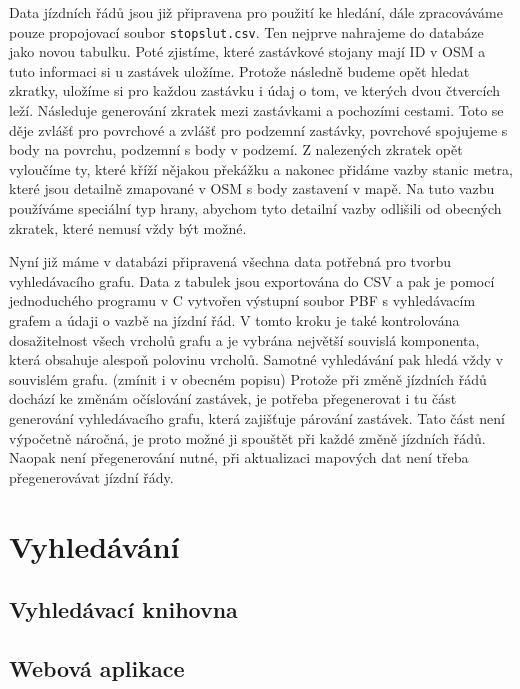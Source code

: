 Data jízdních řádů jsou již připravena pro použití ke hledání, dále zpracováváme
pouze propojovací soubor {\tt stopslut.csv}. Ten nejprve nahrajeme do databáze
jako novou tabulku. Poté zjistíme, které zastávkové stojany mají ID v OSM a tuto
informaci si u zastávek uložíme. Protože následně budeme opět hledat zkratky,
uložíme si pro každou zastávku i údaj o tom, ve kterých dvou čtvercích leží.  
Následuje generování zkratek mezi zastávkami a pochozími cestami. Toto se děje
zvlášť pro povrchové a zvlášť pro podzemní zastávky, povrchové spojujeme s body
na povrchu, podzemní s body v podzemí. Z nalezených zkratek opět vyloučíme ty,
které kříží nějakou překážku a nakonec přidáme vazby stanic metra, které jsou
detailně zmapované v OSM s body zastavení v mapě. Na tuto vazbu používáme
speciální typ hrany, abychom tyto detailní vazby odlišili od obecných zkratek,
které nemusí vždy být možné. 

Nyní již máme v databázi připravená všechna data potřebná pro tvorbu
vyhledávacího grafu. Data z tabulek jsou exportována do CSV a pak je pomocí
jednoduchého programu v C vytvořen výstupní soubor PBF s vyhledávacím grafem a
údaji o vazbě na jízdní řád. V tomto kroku je také kontrolována dosažitelnost
všech vrcholů grafu a je vybrána největší souvislá komponenta, která obsahuje
alespoň polovinu vrcholů. Samotné vyhledávání pak hledá vždy v souvislém grafu.
(\TODO zmínit i v obecném popisu) Protože při změně jízdních řádů dochází ke změnám
očíslování zastávek, je potřeba přegenerovat i tu část generování vyhledávacího
grafu, která zajišťuje párování zastávek. Tato část není výpočetně náročná, je
proto možné ji spouštět při každé změně jízdních řádů. Naopak není přegenerování
nutné, při aktualizaci mapových dat není třeba přegenerovávat jízdní řády. 
\section{Vyhledávání}
\subsection{Vyhledávací knihovna}
\subsection{Webová aplikace}
